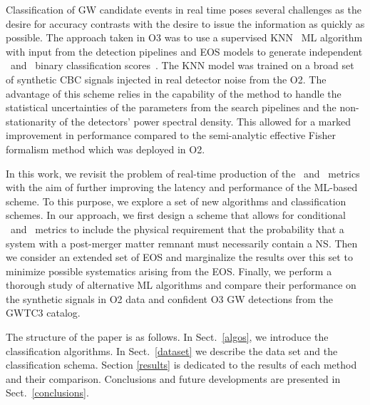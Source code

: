 Classification of \ac{GW} candidate events in real time poses several challenges as the desire for accuracy contrasts with the desire to issue the information as
quickly as possible. The approach taken in \ac{O3} was to use a supervised \ac{KNN}~\cite{Pedregosa:2011ork} \ac{ML} algorithm with input from the detection pipelines
and \ac{EOS} models to generate independent \hasns\ and \hasrem\ binary classification scores~\cite{Chatterjee:2019avs}. The \ac{KNN} model was trained on a broad set
of synthetic \ac{CBC} signals injected in real detector noise from the \ac{O2}. The advantage of this scheme relies in the capability of the method to handle the
statistical uncertainties of the parameters from the search pipelines and the non-stationarity of the detectors' power spectral density. This allowed for a marked
improvement in performance compared to the semi-analytic effective Fisher formalism method which was deployed in \ac{O2}.

In this work, we revisit the problem of real-time production of the \hasns\ and \hasrem\ metrics with the aim of further improving the latency and performance of the
\ac{ML}-based scheme. To this purpose, we explore a set of new algorithms and classification schemes. In our approach, we first design a scheme that allows for
conditional \hasns\ and \hasrem\ metrics to include the physical requirement that the probability that a system with a post-merger matter remnant must necessarily
contain a \ac{NS}. Then we consider an extended set of \ac{EOS} and marginalize the results over this set to minimize possible systematics arising from the \ac{EOS}.
Finally, we perform a thorough study of alternative \ac{ML} algorithms and compare their performance on the synthetic signals in \ac{O2} data and confident \ac{O3}
\ac{GW} detections from the \ac{GWTC3} catalog.

The structure of the paper is as follows. In Sect.~\ref{algos}, we introduce the classification algorithms. In Sect.~\ref{dataset} we describe the data set and the
classification schema. Section \ref{results} is dedicated to the results of each method and their comparison. Conclusions and future developments are presented in
Sect.~\ref{conclusions}.
